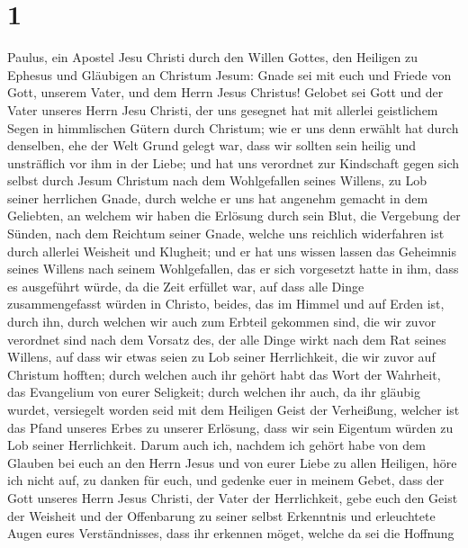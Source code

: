 \hypertarget{section}{%
\section{1}\label{section}}

 Paulus, ein Apostel Jesu Christi durch den Willen Gottes,
den Heiligen zu Ephesus und Gläubigen an Christum Jesum: 
Gnade sei mit euch und Friede von Gott, unserem Vater, und dem Herrn
Jesus Christus!  Gelobet sei Gott und der Vater unseres
Herrn Jesu Christi, der uns gesegnet hat mit allerlei geistlichem Segen
in himmlischen Gütern durch Christum;  wie er uns denn
erwählt hat durch denselben, ehe der Welt Grund gelegt war, dass wir
sollten sein heilig und unsträflich vor ihm in der Liebe; 
und hat uns verordnet zur Kindschaft gegen sich selbst durch Jesum
Christum nach dem Wohlgefallen seines Willens,  zu Lob
seiner herrlichen Gnade, durch welche er uns hat angenehm gemacht in dem
Geliebten,  an welchem wir haben die Erlösung durch sein
Blut, die Vergebung der Sünden, nach dem Reichtum seiner Gnade,
 welche uns reichlich widerfahren ist durch allerlei
Weisheit und Klugheit;  und er hat uns wissen lassen das
Geheimnis seines Willens nach seinem Wohlgefallen, das er sich
vorgesetzt hatte in ihm,  dass es ausgeführt würde, da die
Zeit erfüllet war, auf dass alle Dinge zusammengefasst würden in
Christo, beides, das im Himmel und auf Erden ist, durch ihn,
 durch welchen wir auch zum Erbteil gekommen sind, die wir
zuvor verordnet sind nach dem Vorsatz des, der alle Dinge wirkt nach dem
Rat seines Willens,  auf dass wir etwas seien zu Lob seiner
Herrlichkeit, die wir zuvor auf Christum hofften;  durch
welchen auch ihr gehört habt das Wort der Wahrheit, das Evangelium von
eurer Seligkeit; durch welchen ihr auch, da ihr gläubig wurdet,
versiegelt worden seid mit dem Heiligen Geist der Verheißung,
 welcher ist das Pfand unseres Erbes zu unserer Erlösung,
dass wir sein Eigentum würden zu Lob seiner Herrlichkeit. 
Darum auch ich, nachdem ich gehört habe von dem Glauben bei euch an den
Herrn Jesus und von eurer Liebe zu allen Heiligen,  höre
ich nicht auf, zu danken für euch, und gedenke euer in meinem Gebet,
 dass der Gott unseres Herrn Jesus Christi, der Vater der
Herrlichkeit, gebe euch den Geist der Weisheit und der Offenbarung zu
seiner selbst Erkenntnis  und erleuchtete Augen eures
Verständnisses, dass ihr erkennen möget, welche da sei die Hoffnung
